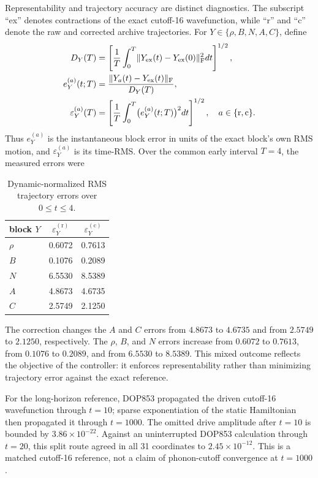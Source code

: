 \documentclass[10pt,twocolumn]{article}
\newcommand{\norm}[1]{\lVert#1\rVert}
\begin{document}
Representability and trajectory accuracy are distinct diagnostics.  The
subscript ``ex'' denotes contractions of the exact cutoff-16 wavefunction,
while ``r'' and ``c'' denote the raw and corrected archive trajectories.  For
$Y\in\{\rho,B,N,A,C\}$, define
\begin{equation}
\begin{aligned}
D_Y(T)&=\left[\frac1T\int_0^T
\norm{Y_{\rm ex}(t)-Y_{\rm ex}(0)}_{\rm F}^2dt\right]^{1/2},\\
e_Y^{(a)}(t;T)&=\frac{\norm{Y_a(t)-Y_{\rm ex}(t)}_{\rm F}}{D_Y(T)},\\
\varepsilon_Y^{(a)}(T)&=
\left[\frac1T\int_0^T\bigl(e_Y^{(a)}(t;T)\bigr)^2dt\right]^{1/2},
\quad a\in\{\mathrm r,\mathrm c\}.
\end{aligned}
\label{eq:trajectory-error}
\end{equation}
Thus $e_Y^{(a)}$ is the instantaneous block error in units of the exact
block's own RMS motion, and $\varepsilon_Y^{(a)}$ is its time-RMS.  Over the
common early interval $T=4$, the measured errors were
\begin{table}[H]
\centering
\small
\begin{tabular}{@{}lcc@{}}
\toprule
block $Y$ & $\varepsilon_Y^{(\mathrm r)}$
& $\varepsilon_Y^{(\mathrm c)}$\\
\midrule
$\rho$ & 0.6072 & 0.7613\\
$B$    & 0.1076 & 0.2089\\
$N$    & 6.5530 & 8.5389\\
$A$    & 4.8673 & 4.6735\\
$C$    & 2.5749 & 2.1250\\
\bottomrule
\end{tabular}
\caption{Dynamic-normalized RMS trajectory errors over $0\leq t\leq4$.}
\label{tab:accuracy}
\end{table}
The correction changes the $A$ and $C$ errors from $4.8673$ to $4.6735$ and
from $2.5749$ to $2.1250$, respectively.  The $\rho$, $B$, and $N$ errors
increase from $0.6072$ to $0.7613$, from $0.1076$ to $0.2089$, and from
$6.5530$ to $8.5389$.  This mixed outcome reflects the objective of the
controller: it enforces representability rather than minimizing trajectory
error against the exact reference.

For the long-horizon reference, DOP853 propagated the driven cutoff-16
wavefunction through $t=10$; sparse exponentiation of the static Hamiltonian
then propagated it through $t=1000$.  The omitted drive amplitude after
$t=10$ is bounded by $3.86\times10^{-22}$.  Against an uninterrupted DOP853
calculation through $t=20$, this split route agreed in all 31 coordinates to
$2.45\times10^{-12}$.  This is a matched cutoff-16 reference, not a claim of
phonon-cutoff convergence at $t=1000$.
\end{document}
